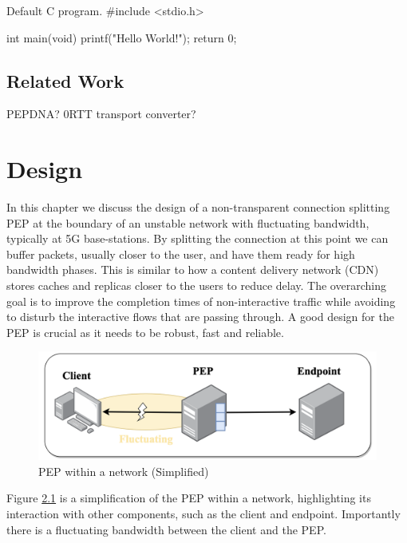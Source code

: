 \documentclass[a4paper,english, 11pt]{report}
\begin{document}
\begin{autonumlstlisting}[label=lst:hello_world]{Default C program.}
#include <stdio.h>

int main(void)
{
	printf("Hello World!");
	return 0;
}

\end{autonumlstlisting}

\section{Related Work}
PEPDNA? 0RTT transport converter?\cite{bandwidth_changes}

\chapter{Design} %
In this chapter we discuss the design of a non-transparent connection splitting PEP at the boundary of an unstable network with fluctuating bandwidth, typically at 5G base-stations. By splitting the connection at this point we can buffer packets, usually closer to the user, and have them ready for high bandwidth phases. This is similar to how a content delivery network (CDN) stores caches and replicas closer to the users to reduce delay. The overarching goal is to improve the completion times of non-interactive traffic while avoiding to disturb the interactive flows that are passing through. A good design for the PEP is crucial as it needs to be robust, fast and reliable. \\

\begin{figure} %
	\centering
	\includegraphics[scale=0.45]{../diagrams/drawio/simple_pep_design.png}
  	\caption{PEP within a network (Simplified)}
  	\label{fig:simple_pep_design}
\end{figure}

Figure \ref{fig:simple_pep_design} is a simplification of the PEP within a network, highlighting its interaction with other components, such as the client and endpoint. Importantly there is a fluctuating bandwidth between the client and the PEP.
\end{document}
